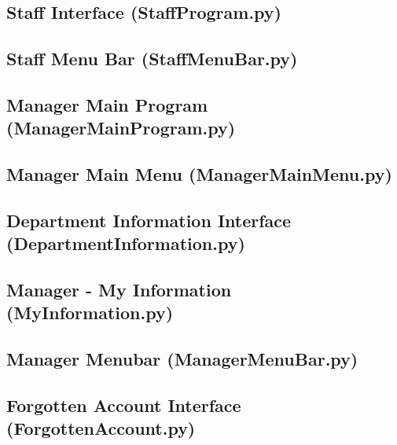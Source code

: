 \begin{landscape}
\begin{scriptsize}
\newpage
\subsection{Staff Interface (StaffProgram.py)}\label{SP}

\newpage
\subsection{Staff Menu Bar (StaffMenuBar.py)}\label{SMB}

\newpage
\subsection{Manager Main Program (ManagerMainProgram.py)}\label{MMP}

\newpage
\subsection{Manager Main Menu (ManagerMainMenu.py)}\label{MMM}

\newpage
\subsection{Department Information Interface (DepartmentInformation.py)}\label{SI}

\newpage
\subsection{Manager - My Information (MyInformation.py)}\label{MI}

\newpage
\subsection{Manager Menubar (ManagerMenuBar.py)}\label{MMB}

\newpage
\subsection{Forgotten Account Interface (ForgottenAccount.py)}\label{FA}


\end{scriptsize}
\end{landscape}
